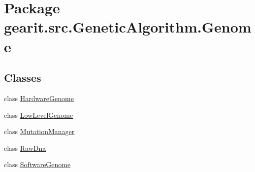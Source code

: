 \hypertarget{namespacegearit_1_1src_1_1_genetic_algorithm_1_1_genome}{\section{Package gearit.\+src.\+Genetic\+Algorithm.\+Genome}
\label{namespacegearit_1_1src_1_1_genetic_algorithm_1_1_genome}
}
\subsection*{Classes}
\begin{DoxyCompactItemize}
\item 
class \hyperlink{classgearit_1_1src_1_1_genetic_algorithm_1_1_genome_1_1_hardware_genome}{Hardware\+Genome}
\item 
class \hyperlink{classgearit_1_1src_1_1_genetic_algorithm_1_1_genome_1_1_low_level_genome}{Low\+Level\+Genome}
\item 
class \hyperlink{classgearit_1_1src_1_1_genetic_algorithm_1_1_genome_1_1_mutation_manager}{Mutation\+Manager}
\item 
class \hyperlink{classgearit_1_1src_1_1_genetic_algorithm_1_1_genome_1_1_raw_dna}{Raw\+Dna}
\item 
class \hyperlink{classgearit_1_1src_1_1_genetic_algorithm_1_1_genome_1_1_software_genome}{Software\+Genome}
\end{DoxyCompactItemize}
